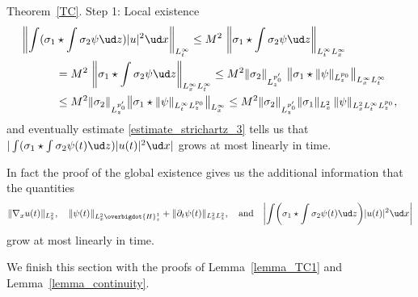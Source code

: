 \begin{ProofOf}{Theorem~\ref{TC}. Step 1: Local existence}
\begin{equation}
\begin{split}
\biggl\|\int(\sigma_{1}&\star\int\sigma_{2}\psi\ud z)|u|^{2}\ud x\biggr\|_{L_{t}^{\infty}}\leq M^{2}\,\left\|\sigma_{1}\star\int\sigma_{2}\psi\ud z\right\|_{L_{t}^{\infty}L_{x}^{\infty}}\\
&=M^{2}\,\left\|\sigma_{1}\star\int\sigma_{2}\psi\ud z\right\|_{L_{x}^{\infty}L_{t}^{\infty}}\leq M^{2}\|\sigma_{2}\|_{L_{z}^{p_{0}'}}\,\left\|\sigma_{1}\star\|\psi\|_{L_{z}^{p_{0}}}\right\|_{L_{x}^{\infty}L_{t}^{\infty}}\\
&\leq M^{2}\|\sigma_{2}\|_{L_{z}^{p_{0}'}}\bigl\|\sigma_{1}\star\|\psi\|_{L_{t}^{\infty}L_{z}^{p_{0}}}\bigr\|_{L_{x}^{\infty}}\leq M^{2}\|\sigma_{2}\|_{L_{z}^{p_{0}'}}\|\sigma_{1}\|_{L_{x}^{2}}\,\|\psi\|_{L_{x}^{2}L_{t}^{\infty}L_{z}^{p_{0}}},
\end{split}
\end{equation}
and eventually estimate \eqref{estimate_strichartz_3} tells us that $|\int(\sigma_{1}\star\int\sigma_{2}\psi(t)\ud z)|u(t)|^{2}\ud x|$ grows at most linearly in time.
\end{ProofOf}

\begin{rmk}
In fact the proof of the global existence gives us the additional information that the quantities
\[
\|\nabla_{x}u(t)\|_{L_{x}^{2}},\quad \|\psi(t)\|_{L_{x}^{2}\overbigdot{H}_{z}^{1}}+\|\partial_{t}\psi(t)\|_{L_{x}^{2}L_{z}^{2}},\quad\text{and}\quad
\biggl|\int\biggl(\sigma_{1}\star\int\sigma_{2}\psi(t)\ud z\biggr)|u(t)|^{2}\ud x\biggr|
\]
grow at most linearly in time.
\end{rmk}

We finish this section with the proofs of Lemma~\ref{lemma_TC1} and Lemma~\ref{lemma_continuity}.

